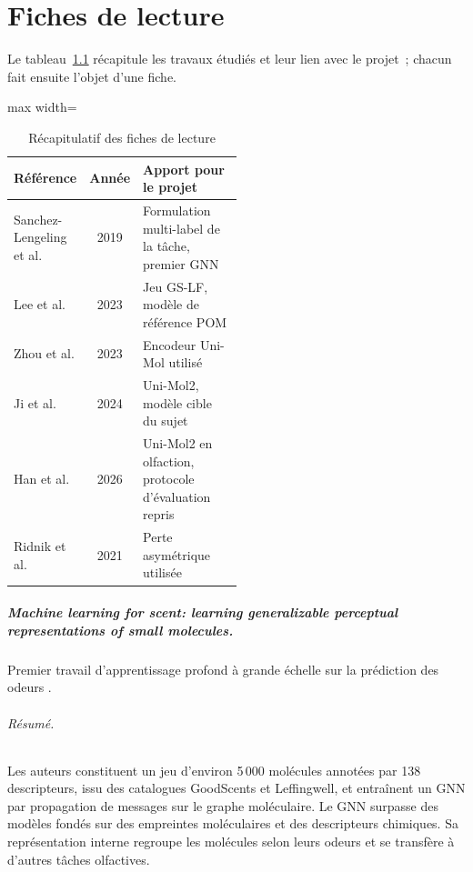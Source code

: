 \chapter{Fiches de lecture}
\label{ann:FichesLecture}

Le tableau~\ref{tab:FichesLecture} récapitule les travaux étudiés et leur lien avec le projet~; chacun fait ensuite l'objet d'une fiche.

\begin{table}[H]
   \centering
   \begin{adjustbox}{max width=\linewidth}
   \begin{tabular}{|l|c|p{0.5\linewidth}|}
      \hline
      Référence & Année & Apport pour le projet \\
      \hline
      \hline
      Sanchez-Lengeling et al. \cite{SanchezLengeling-2019} & 2019 & Formulation multi-label de la tâche, premier GNN \\
      \hline
      Lee et al. \cite{Lee-2023} & 2023 & Jeu GS-LF, modèle de référence POM \\
      \hline
      Zhou et al. \cite{Zhou-2023} & 2023 & Encodeur Uni-Mol utilisé \\
      \hline
      Ji et al. \cite{Ji-2024} & 2024 & Uni-Mol2, modèle cible du sujet \\
      \hline
      Han et al. \cite{Han-2026} & 2026 & Uni-Mol2 en olfaction, protocole d'évaluation repris \\
      \hline
      Ridnik et al. \cite{Ridnik-2021} & 2021 & Perte asymétrique utilisée \\
      \hline
   \end{tabular}
   \end{adjustbox}
   \caption{Récapitulatif des fiches de lecture}
   \label{tab:FichesLecture}
\end{table}

\paragraph{\emph{Machine learning for scent: learning generalizable perceptual representations of small molecules}.}
Premier travail d'apprentissage profond à grande échelle sur la prédiction des odeurs \cite{SanchezLengeling-2019}.

\subparagraph{Résumé.}
Les auteurs constituent un jeu d'environ 5\,000 molécules annotées par 138 descripteurs, issu des catalogues GoodScents et Leffingwell, et entraînent un GNN par propagation de messages sur le graphe moléculaire.
Le GNN surpasse des modèles fondés sur des empreintes moléculaires et des descripteurs chimiques.
Sa représentation interne regroupe les molécules selon leurs odeurs et se transfère à d'autres tâches olfactives.

